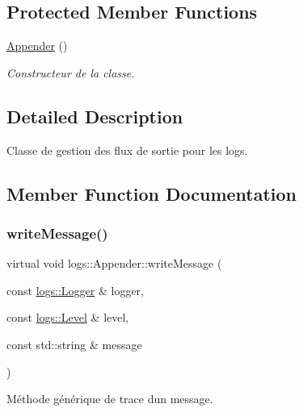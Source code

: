 \subsection*{Protected Member Functions}
\begin{DoxyCompactItemize}
\item 
\mbox{\label{classlogs_1_1Appender_a6c2acb37a497bad50ecb8bb13f906569}} 
\hyperlink{classlogs_1_1Appender_a6c2acb37a497bad50ecb8bb13f906569}{Appender} ()
\begin{DoxyCompactList}\small\item\em Constructeur de la classe. \end{DoxyCompactList}\end{DoxyCompactItemize}


\subsection{Detailed Description}
Classe de gestion des flux de sortie pour les logs. 

\subsection{Member Function Documentation}
\mbox{\label{classlogs_1_1Appender_a940a63ebc17c8e29c1922948903c60e1}} 
\subsubsection{\texorpdfstring{write\+Message()}{writeMessage()}}
{\footnotesize\ttfamily virtual void logs\+::\+Appender\+::write\+Message (\begin{DoxyParamCaption}\item[{const \hyperlink{classlogs_1_1Logger}{logs\+::\+Logger} \&}]{logger,  }\item[{const \hyperlink{classlogs_1_1Level}{logs\+::\+Level} \&}]{level,  }\item[{const std\+::string \&}]{message }\end{DoxyParamCaption})\hspace{0.3cm}{\ttfamily [pure virtual]}}



Méthode générique de trace d\textquotesingle{}un message. 



